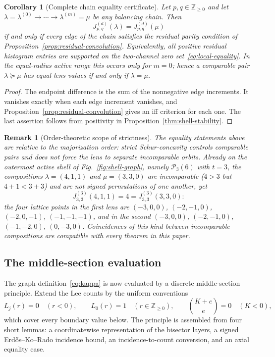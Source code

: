 \documentclass[pdflatex,sn-mathphys-num]{sn-jnl}
\theoremstyle{thmstyleone}
\newtheorem{corollary}[theorem]{Corollary}
\theoremstyle{thmstylethree}
\theoremstyle{thmstyletwo}
\newtheorem{remark}[theorem]{Remark}
\newcommand{\Z}{\mathbb Z}
\begin{document}
\begin{corollary}[Complete chain equality certificate]
\label{cor:chain-equality}
Let $p,q\in\Z_{\ge0}$ and let
$\lambda=\lambda^{(0)}\to\cdots\to\lambda^{(m)}=\mu$ be any balancing chain.
Then
\[
 J_{p,q}^{(d)}(\lambda)=J_{p,q}^{(d)}(\mu)
\]
if and only if every edge of the chain satisfies the residual parity
condition of Proposition~\ref{prop:residual-convolution}.  Equivalently, all
positive residual histogram entries are supported on the two-channel zero
set~\eqref{eq:local-equality}.  In the equal-radius active range this occurs
only for $m=0$; hence a comparable pair $\lambda\succeq\mu$ has equal lens
values if and only if $\lambda=\mu$.
\end{corollary}

\begin{proof}
The endpoint difference is the sum of the nonnegative edge increments.
It vanishes exactly when each edge increment vanishes, and
Proposition~\ref{prop:residual-convolution} gives an iff criterion for each
one.  The last assertion follows from positivity in
Proposition~\ref{thm:shell-stability}.
\end{proof}

\begin{remark}[Order-theoretic scope of strictness]
\label{rem:incomparable}
The equality statements above are relative to the majorization order:
strict Schur-concavity controls comparable pairs and does not force the
lens to separate incomparable orbits.  Already on the outermost active
shell of Fig.~\ref{fig:shell-graph}, namely $\mathcal P_3(6)$ with
$t=3$, the compositions $\lambda=(4,1,1)$ and $\mu=(3,3,0)$ are
incomparable ($4>3$ but $4+1<3+3$) and are not signed permutations of one
another, yet
\[
 J^{(3)}_{3,3}(4,1,1)=4=J^{(3)}_{3,3}(3,3,0):
\]
the four lattice points in the first lens are
$(-3,0,0)$, $(-2,-1,0)$, $(-2,0,-1)$, $(-1,-1,-1)$, and in the second
$(-3,0,0)$, $(-2,-1,0)$, $(-1,-2,0)$, $(0,-3,0)$.  Coincidences of this
kind between incomparable compositions are compatible with every theorem in
this paper.
\end{remark}

\subsection{The middle-section evaluation}
\label{sec:middle-section}

The graph definition~\eqref{eq:kappa} is now evaluated by a discrete
middle-section principle.  Extend the Lee counts by the uniform conventions
\[
 L_j(r)=0\quad(r<0),\qquad
 L_0(r)=1\quad(r\in\Z_{\ge0}),\qquad
 \binom{K+e}{e}=0\quad(K<0),
\]
which cover every boundary value below.  The principle is assembled from
four short lemmas: a coordinatewise representation of the bisector layers, a
signed Erd\H{o}s--Ko--Rado incidence bound, an incidence-to-count
conversion, and an axial equality case.
\end{document}
